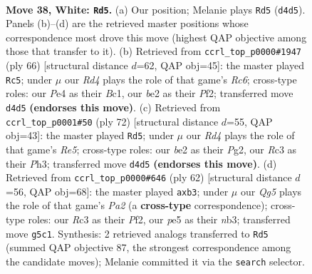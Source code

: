 \documentclass[11pt]{article}
\begin{document}
\clearpage

\begin{figure}[p]\centering
\begin{subfigure}{0.46\textwidth}\centering
\resizebox{\linewidth}{!}{%
\newchessgame
\chessboard[
  setfen={k3r3/1p1n4/1r1p4/4p1Q1/3RP3/1PR2P2/K3b1PP/8 w - - 0 38},
  showmover=false,
  pgfstyle=straightmove, color=movearrow, markmove={d4-d5}
]}
\caption{}
\end{subfigure}\hfill
\begin{subfigure}{0.46\textwidth}\centering
\resizebox{\linewidth}{!}{%
\newchessgame
\chessboard[
  setfen={2r3k1/r1p1n1p1/2R2p1p/8/p2R3P/P5P1/5PK1/2B5 w - - 3 34},
  showmover=false,
  pgfstyle=straightmove, color=movearrow, markmove={c6-c5}
]}
\caption{}
\end{subfigure}
\\[4pt]
\begin{subfigure}{0.46\textwidth}\centering
\resizebox{\linewidth}{!}{%
\newchessgame
\chessboard[
  setfen={1r4k1/1r4p1/5p1p/pp2R3/8/PR2P2P/5PP1/7K w - - 0 37},
  showmover=false,
  pgfstyle=straightmove, color=movearrow, markmove={e5-d5}
]}
\caption{}
\end{subfigure}\hfill
\begin{subfigure}{0.46\textwidth}\centering
\resizebox{\linewidth}{!}{%
\newchessgame
\chessboard[
  setfen={3r2k1/1p3p1p/p2r4/4Rp2/3p4/1nP4P/PP1R1PP1/5K2 w - - 0 32},
  showmover=false,
  pgfstyle=straightmove, color=movearrow, markmove={a2-b3}
]}
\caption{}
\end{subfigure}
\caption{\textbf{Move 38, White: \texttt{Rd5}.} (a) Our position; Melanie plays \texttt{Rd5} (\texttt{d4d5}). Panels (b)--(d) are the retrieved master positions whose correspondence most drove this move (highest QAP objective among those that transfer to it). (b) Retrieved from \texttt{ccrl\_top\_p0000\#1947} (ply 66) [structural distance $d$=62, QAP obj=45]: the master played \texttt{Rc5}; under $\mu$ our \emph{Rd4} plays the role of that game's \emph{Rc6}; cross-type roles: our \emph{P}e4 as their \emph{B}c1, our \emph{b}e2 as their \emph{P}f2; transferred move \texttt{d4d5} \textbf{(endorses this move)}. (c) Retrieved from \texttt{ccrl\_top\_p0001\#50} (ply 72) [structural distance $d$=55, QAP obj=43]: the master played \texttt{Rd5}; under $\mu$ our \emph{Rd4} plays the role of that game's \emph{Re5}; cross-type roles: our \emph{b}e2 as their \emph{P}g2, our \emph{R}c3 as their \emph{P}h3; transferred move \texttt{d4d5} \textbf{(endorses this move)}. (d) Retrieved from \texttt{ccrl\_top\_p0000\#646} (ply 62) [structural distance $d$=56, QAP obj=68]: the master played \texttt{axb3}; under $\mu$ our \emph{Qg5} plays the role of that game's \emph{Pa2} (a \textbf{cross-type} correspondence); cross-type roles: our \emph{R}c3 as their \emph{P}f2, our \emph{p}e5 as their \emph{n}b3; transferred move \texttt{g5c1}. Synthesis: 2 retrieved analogs transferred to \texttt{Rd5} (summed QAP objective 87, the strongest correspondence among the candidate moves); Melanie committed it via the \texttt{search} selector.}
\label{fig:thought-m74}
\end{figure}
\end{document}
